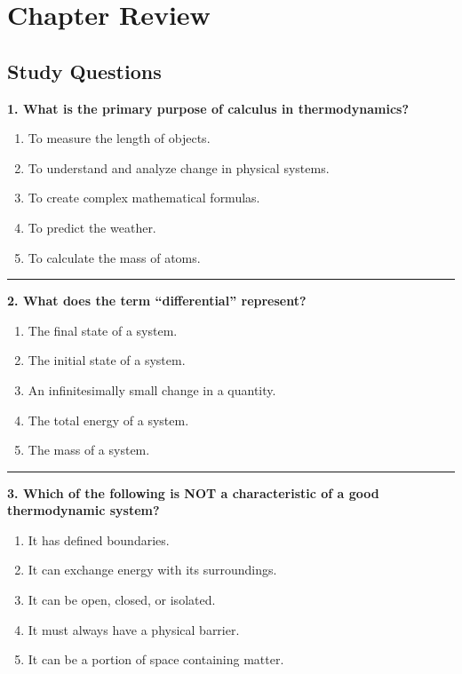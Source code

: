 \documentclass[
  9pt,
]{extbook}
\providecommand{\tightlist}{%
  \setlength{\itemsep}{0pt}\setlength{\parskip}{0pt}}
\theoremstyle{definition}
\theoremstyle{definition}
\theoremstyle{definition}
\theoremstyle{definition}
\theoremstyle{remark}
\begin{document}
\section{Chapter Review}\label{rev1}

\subsection{Study Questions}\label{quest1}

\textbf{1. What is the primary purpose of calculus in thermodynamics?}

\begin{enumerate}
\def\labelenumi{\alph{enumi}.}
\tightlist
\item
  To measure the length of objects.
\item
  To understand and analyze change in physical systems.
\item
  To create complex mathematical formulas.
\item
  To predict the weather.
\item
  To calculate the mass of atoms.
\end{enumerate}

\begin{center}\rule{0.5\linewidth}{0.5pt}\end{center}

\textbf{2. What does the term ``differential'' represent?}

\begin{enumerate}
\def\labelenumi{\alph{enumi}.}
\tightlist
\item
  The final state of a system.
\item
  The initial state of a system.
\item
  An infinitesimally small change in a quantity.
\item
  The total energy of a system.
\item
  The mass of a system.
\end{enumerate}

\begin{center}\rule{0.5\linewidth}{0.5pt}\end{center}

\textbf{3. Which of the following is NOT a characteristic of a good thermodynamic system?}

\begin{enumerate}
\def\labelenumi{\alph{enumi}.}
\tightlist
\item
  It has defined boundaries.
\item
  It can exchange energy with its surroundings.
\item
  It can be open, closed, or isolated.
\item
  It must always have a physical barrier.
\item
  It can be a portion of space containing matter.
\end{enumerate}
\end{document}
